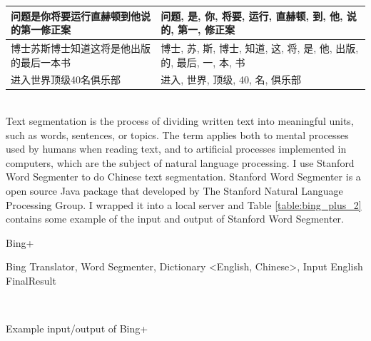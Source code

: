 \begin{CJK}{UTF8}{gbsn}
\begin{table}[ht]
\begin{tabular}{| p{3.5cm} | p{3.5cm} |}
        \hline
        问题是你将要运行直赫顿到他说的第一修正案 & 问题, 是, 你, 将要, 运行, 直赫顿, 到, 他, 说的, 第一, 修正案\\
        \hline
        博士苏斯博士知道这将是他出版的最后一本书 & 博士, 苏, 斯, 博士, 知道, 这, 将, 是, 他, 出版, 的, 最后, 一, 本, 书\\
        \hline
        进入世界顶级40名俱乐部 & 进入, 世界, 顶级, 40, 名, 俱乐部\\
        \hline
    \end{tabular}
\end{table}
\\
Text segmentation is the process of dividing written text into meaningful units, such as words, sentences, or topics. The term applies both to mental processes used by humans when reading text, and to artificial processes implemented in computers, which are the subject of natural language processing. I use Stanford Word Segmenter to do Chinese text segmentation. Stanford Word Segmenter is a open source Java package that developed by The Stanford Natural Language Processing Group. I wrapped it into a local server and Table \ref{table:bing_plus_2} contains some example of the input and output of Stanford Word Segmenter.
\\
\begin{algorithm}[ht]
\caption{Bing+}
\label{algorithm:wsd_4}
\begin{algorithmic}
\REQUIRE Bing Translator, Word Segmenter, Dictionary \textless English, Chinese\textgreater, Input English
        \ENDIF
    \ENDFOR
        \ENDIF
    \ENDFOR
\ENDIF
\RETURN FinalResult
\end{algorithmic}
\end{algorithm}
\\
\begin{table}[ht]
    \caption{Example input/output of Bing+}
    \begin{center}

\end{center}
\end{table}
\end{CJK}
